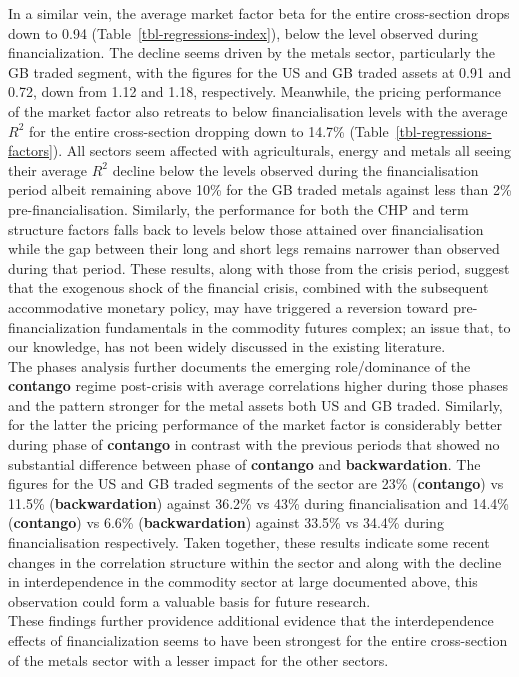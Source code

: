 \documentclass[
  authoryear,
  preprint,
  3p]{elsarticle}
\begin{document}
In a similar vein, the average market factor beta for the entire
cross-section drops down to 0.94 (Table~\ref{tbl-regressions-index}),
below the level observed during financialization. The decline seems
driven by the metals sector, particularly the GB traded segment, with
the figures for the US and GB traded assets at 0.91 and 0.72, down from
1.12 and 1.18, respectively. Meanwhile, the pricing performance of the
market factor also retreats to below financialisation levels with the
average \(R^{2}\) for the entire cross-section dropping down to 14.7\%
(Table~\ref{tbl-regressions-factors}). All sectors seem affected with
agriculturals, energy and metals all seeing their average \(R^{2}\)
decline below the levels observed during the financialisation period
albeit remaining above 10\% for the GB traded metals against less than
2\% pre-financialisation. Similarly, the performance for both the CHP
and term structure factors falls back to levels below those attained
over financialisation while the gap between their long and short legs
remains narrower than observed during that period. These results, along
with those from the crisis period, suggest that the exogenous shock of
the financial crisis, combined with the subsequent accommodative
monetary policy, may have triggered a reversion toward
pre-financialization fundamentals in the commodity futures complex; an
issue that, to our knowledge, has not been widely discussed in the
existing literature.\\
The phases analysis further documents the emerging role/dominance of the
\textbf{contango} regime post-crisis with average correlations higher
during those phases and the pattern stronger for the metal assets both
US and GB traded. Similarly, for the latter the pricing performance of
the market factor is considerably better during phase of
\textbf{contango} in contrast with the previous periods that showed no
substantial difference between phase of \textbf{contango} and
\textbf{backwardation}. The figures for the US and GB traded segments of
the sector are 23\% (\textbf{contango}) vs 11.5\%
(\textbf{backwardation}) against 36.2\% vs 43\% during financialisation
and 14.4\% (\textbf{contango}) vs 6.6\% (\textbf{backwardation}) against
33.5\% vs 34.4\% during financialisation respectively. Taken together,
these results indicate some recent changes in the correlation structure
within the sector and along with the decline in interdependence in the
commodity sector at large documented above, this observation could form
a valuable basis for future research.\\
These findings further providence additional evidence that the
interdependence effects of financialization seems to have been strongest
for the entire cross-section of the metals sector with a lesser impact
for the other sectors.
\end{document}
